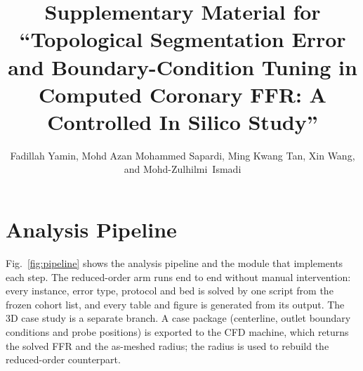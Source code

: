 \documentclass[journal,twoside,web,onecolumn]{ieeecolor}
\begin{document}
\sloppy
\title{Supplementary Material for ``Topological Segmentation Error and Boundary-Condition Tuning in Computed Coronary
FFR: A Controlled In Silico Study''}
\author{Fadillah Yamin, Mohd Azan Mohammed Sapardi, Ming Kwang Tan, Xin Wang, and \mbox{Mohd-Zulhilmi Ismadi}\endgraf\vspace{-\baselineskip}}
\maketitle

\section{Analysis Pipeline}
Fig.~\ref{fig:pipeline} shows the analysis pipeline and the module that implements each step. The reduced-order arm
runs end to end without manual intervention: every instance, error type, protocol and bed is solved by one script
from the frozen cohort list, and every table and figure is generated from its output. The 3D case study is a separate
branch. A case package (centerline, outlet boundary conditions and probe positions) is exported to the CFD machine,
which returns the solved FFR and the as-meshed radius; the radius is used to rebuild the reduced-order counterpart.
\end{document}

